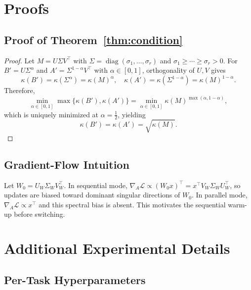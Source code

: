 \documentclass{article}
\newcommand{\Wbase}{W_0}
\DeclareMathOperator{\diag}{diag}
\begin{document}



\appendix

\section{Proofs}
\label{app:proofs}

\subsection{Proof of Theorem~\ref{thm:condition}}
\begin{proof}
Let $M = U\Sigma V^\top$ with $\Sigma = \diag(\sigma_1, \ldots, \sigma_r)$ and $\sigma_1 \ge \cdots \ge \sigma_r > 0$.
For $B' = U\Sigma^\alpha$ and $A' = \Sigma^{1-\alpha}V^\top$ with $\alpha \in [0,1]$, orthogonality of $U,V$ gives
\[
\kappa(B') = \kappa(\Sigma^\alpha) = \kappa(M)^\alpha,\quad
\kappa(A') = \kappa(\Sigma^{1-\alpha}) = \kappa(M)^{1-\alpha}.
\]
Therefore,
\[
\min_{\alpha\in[0,1]} \max\{\kappa(B'),\kappa(A')\}
=
\min_{\alpha\in[0,1]} \kappa(M)^{\max(\alpha,1-\alpha)},
\]
which is uniquely minimized at $\alpha=\tfrac{1}{2}$, yielding
\[
\kappa(B')=\kappa(A')=\sqrt{\kappa(M)}.
\]
\end{proof}

\subsection{Gradient-Flow Intuition}
Let $\Wbase = U_W\Sigma_WV_W^\top$.
In sequential mode, $\nabla_A\mathcal{L}\propto(\Wbase x)^\top = x^\top V_W\Sigma_WU_W^\top$, so updates are biased toward dominant singular directions of $\Wbase$.
In parallel mode, $\nabla_A\mathcal{L}\propto x^\top$ and this spectral bias is absent.
This motivates the sequential warm-up before switching.

\section{Additional Experimental Details}
\label{app:additional}

\subsection{Per-Task Hyperparameters}
\label{app:hyperparams}
\end{document}
